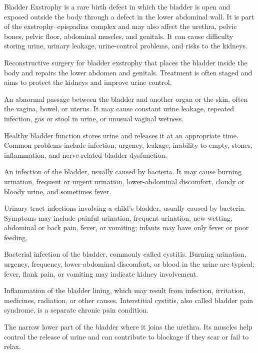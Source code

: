  Bladder Exstrophy is a rare birth defect in which the bladder is open and exposed outside the body through a defect in the lower abdominal wall. It is part of the exstrophy–epispadias complex and may also affect the urethra, pelvic bones, pelvic floor, abdominal muscles, and genitals. It can cause difficulty storing urine, urinary leakage, urine-control problems, and risks to the kidneys.

 Reconstructive surgery for bladder exstrophy that places the bladder inside the body and repairs the lower abdomen and genitals. Treatment is often staged and aims to protect the kidneys and improve urine control.

 An abnormal passage between the bladder and another organ or the skin, often the vagina, bowel, or uterus. It may cause constant urine leakage, repeated infection, gas or stool in urine, or unusual vaginal wetness.

 Healthy bladder function stores urine and releases it at an appropriate time. Common problems include infection, urgency, leakage, inability to empty, stones, inflammation, and nerve-related bladder dysfunction.

 An infection of the bladder, usually caused by bacteria. It may cause burning urination, frequent or urgent urination, lower-abdominal discomfort, cloudy or bloody urine, and sometimes fever.

 Urinary tract infections involving a child’s bladder, usually caused by bacteria. Symptoms may include painful urination, frequent urination, new wetting, abdominal or back pain, fever, or vomiting; infants may have only fever or poor feeding.

 Bacterial infection of the bladder, commonly called cystitis. Burning urination, urgency, frequency, lower-abdominal discomfort, or blood in the urine are typical; fever, flank pain, or vomiting may indicate kidney involvement.

 Inflammation of the bladder lining, which may result from infection, irritation, medicines, radiation, or other causes. Interstitial cystitis, also called bladder pain syndrome, is a separate chronic pain condition.

 The narrow lower part of the bladder where it joins the urethra. Its muscles help control the release of urine and can contribute to blockage if they scar or fail to relax.

